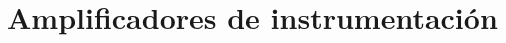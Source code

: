\documentclass[../../tc_tp3_main.tex]{subfiles}
\begin{document}
\chapter{Amplificadores de instrumentaci\'on}
\end{document}
